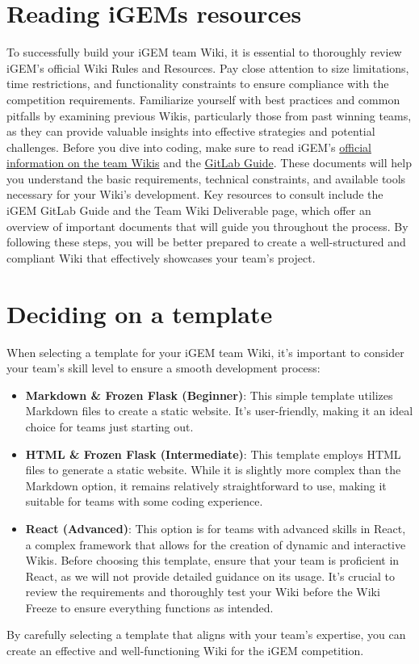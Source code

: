 
    \section{Reading iGEMs resources}
    To successfully build your iGEM team Wiki, it is essential to thoroughly review iGEM’s official Wiki Rules and Resources. Pay close attention to size limitations, time restrictions, and functionality constraints to ensure compliance with the competition requirements. Familiarize yourself with best practices and common pitfalls by examining previous Wikis, particularly those from past winning teams, as they can provide valuable insights into effective strategies and potential challenges. \newline
    Before you dive into coding, make sure to read iGEM’s \href{https://competition.igem.org/deliverables/team-Wiki}{official information on the team Wikis} and the \href{https://competition.igem.org/deliverables/gitlab-guide}{GitLab Guide}. These documents will help you understand the basic requirements, technical constraints, and available tools necessary for your Wiki's development. Key resources to consult include the iGEM GitLab Guide and the Team Wiki Deliverable page, which offer an overview of important documents that will guide you throughout the process. \newline
    By following these steps, you will be better prepared to create a well-structured and compliant Wiki that effectively showcases your team’s project.


    \section{Deciding on a template }
    When selecting a template for your iGEM team Wiki, it’s important to consider your team’s skill level to ensure a smooth development process:

    \begin{itemize}
        \item \textbf{Markdown \& Frozen Flask (Beginner)}: This simple template utilizes Markdown files to create a static website. It's user-friendly, making it an ideal choice for teams just starting out.
        \item \textbf{HTML \& Frozen Flask (Intermediate)}: This template employs HTML files to generate a static website. While it is slightly more complex than the Markdown option, it remains relatively straightforward to use, making it suitable for teams with some coding experience.
        \item \textbf{React (Advanced)}: This option is for teams with advanced skills in React, a complex framework that allows for the creation of dynamic and interactive Wikis. Before choosing this template, ensure that your team is proficient in React, as we will not provide detailed guidance on its usage. It’s crucial to review the requirements and thoroughly test your Wiki before the Wiki Freeze to ensure everything functions as intended.
    \end{itemize}
    By carefully selecting a template that aligns with your team's expertise, you can create an effective and well-functioning Wiki for the iGEM competition.

